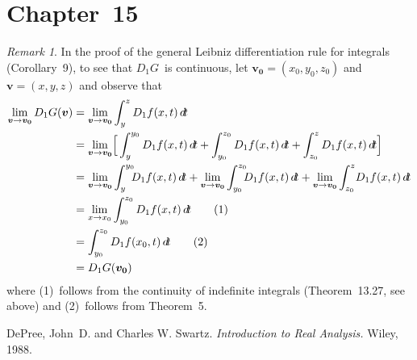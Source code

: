\documentclass[letterpaper,12pt]{article}
\renewcommand{\vec}[1]{\boldsymbol{#1}}
\newcommand{\dt}{\,d\!t}
\theoremstyle{plain}
\theoremstyle{definition}
\theoremstyle{remark}
\newtheorem*{rmk}{Remark}
\begin{document}
\section*{Chapter~15}
\begin{rmk}
In the proof of the general Leibniz differentiation rule for integrals (Corollary~9), to see that \(D_1G\)~is continuous, let \(\vec{v_0}=(x_0,y_0,z_0)\) and \(\vec{v}=(x,y,z)\) and observe that
\begin{align*}
\lim_{\vec{v}\to\vec{v_0}}D_1G(\vec{v})&=\lim_{\vec{v}\to\vec{v_0}}\int_y^z D_1f(x,t)\dt\\
	&=\lim_{\vec{v}\to\vec{v_0}}\Bigl[\,\int_y^{y_0}D_1f(x,t)\dt+\int_{y_0}^{z_0}D_1f(x,t)\dt+\int_{z_0}^z D_1f(x,t)\dt\Bigr]\\
	&=\lim_{\vec{v}\to\vec{v_0}}\int_y^{y_0}\!\!\!D_1f(x,t)\dt+\lim_{\vec{v}\to\vec{v_0}}\int_{y_0}^{z_0}\!\!\!D_1f(x,t)\dt+\lim_{\vec{v}\to\vec{v_0}}\int_{z_0}^z\!D_1f(x,t)\dt\\
	&=\lim_{x\to x_0}\int_{y_0}^{z_0}D_1f(x,t)\dt\tag{1}\\
	&=\int_{y_0}^{z_0}D_1f(x_0,t)\dt\tag{2}\\
	&=D_1G(\vec{v_0})
\end{align*}
where (1)~follows from the continuity of indefinite integrals (Theorem~13.27, see above) and (2)~follows from Theorem~5.
\end{rmk}

\begin{thebibliography}{0}
 DePree, John~D. and Charles W. Swartz. \textit{Introduction to Real Analysis.} Wiley, 1988.
\end{thebibliography}
\end{document}
